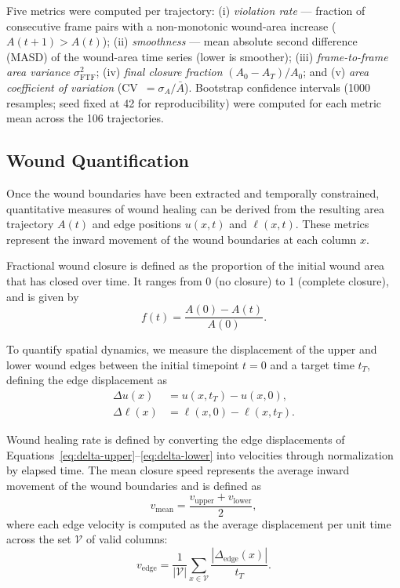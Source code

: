 Five metrics were computed per trajectory:
(i) \emph{violation rate} --- fraction of consecutive frame pairs with a non-monotonic wound-area increase ($A(t+1) > A(t)$);
(ii) \emph{smoothness} --- mean absolute second difference (MASD) of the wound-area time series (lower is smoother);
(iii) \emph{frame-to-frame area variance} $\sigma^2_\text{FTF}$;
(iv) \emph{final closure fraction} $(A_0 - A_T)/A_0$; and
(v) \emph{area coefficient of variation} (CV~$= \sigma_A/\bar{A}$).
Bootstrap confidence intervals (1000 resamples; seed fixed at 42 for reproducibility) were computed for each metric mean across the 106 trajectories.


\subsection{Wound Quantification}

Once the wound boundaries have been extracted and temporally constrained, quantitative measures of wound healing can be derived from the resulting area trajectory $A(t)$ and edge positions $u(x,t)$ and $\ell(x,t)$. These metrics represent the inward movement of the wound boundaries at each column $x$. 

Fractional wound closure is defined as the proportion of the initial wound area that has closed over time. It ranges from 0 (no closure) to 1 (complete closure), and is given by
\begin{equation}
	f(t) = \frac{A(0) - A(t)}{A(0)}.
	\label{eq:fractional-closure}
\end{equation}


To quantify spatial dynamics, we measure the displacement of the upper and lower wound edges between the initial timepoint $t = 0$ and a target time $t_T$, defining the edge displacement as
\begin{align}
	\Delta u(x) &= u(x, t_T) - u(x, 0), \label{eq:delta-upper} \\
	\Delta \ell(x) &= \ell(x, 0) - \ell(x, t_T). \label{eq:delta-lower}
\end{align}


Wound healing rate is defined by converting the edge displacements of Equations~\eqref{eq:delta-upper}--\eqref{eq:delta-lower} into velocities through normalization by elapsed time. The mean closure speed represents the average inward movement of the wound boundaries and is defined as
\begin{equation}
	v_\text{mean} = \frac{v_\text{upper} + v_\text{lower}}{2},
	\label{eq:closure-speed}
\end{equation}
where each edge velocity is computed as the average displacement per unit time across the set $\mathcal{V}$ of valid columns:
\begin{equation}
	v_\text{edge} = \frac{1}{|\mathcal{V}|} \sum_{x \in \mathcal{V}} \frac{|\Delta_\text{edge}(x)|}{t_T}.
	\label{eq:edge-velocity}
\end{equation}

